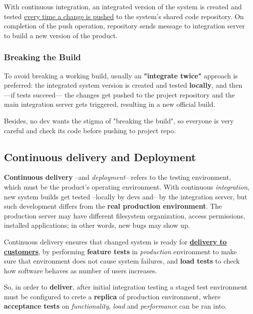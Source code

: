 With continuous integration, an integrated version of the system is created and tested \underline{every time a change is pushed} to the system’s shared code repository.
On completion of the push operation, repository sends message
to integration server to build a new version of the product.

\subsubsection{Breaking the Build}

To avoid breaking a working build, usually an \textbf{"integrate twice"} approach is preferred:
the integrated system version is created and tested \textbf{locally}, and then {---}if tests succeed{---} the changes get pushed to the project repository and the main integration server gets triggered,
resulting in a new official build. 

Besides, no dev wants the stigma of "breaking the build", so everyone is very careful and check its code before pushing to project repo.


\subsection{Continuous delivery and Deployment}
\textbf{Continuous delivery} {--}and \textit{deployment}{--} refers to the testing environment, which must be the product's operating environment.
With continuous \textit{integration}, new system builds get tested {--}locally by devs and{--} by the integration server, but such development differs from the \textbf{real production environment}.
The production server may have different filesystem organization, access
permissions, installed applications;
in other words, new bugs may show up.

Continuous delivery ensures that changed system is ready for \textbf\underline{{delivery}
to customers},
by performing 
\textbf{feature tests} in \textit{production} environment
 to make sure that environment does not cause system failures, and
\textbf{load tests} to check how software behaves as number of users increases.

So, in order to \textbf{deliver}, after initial integration testing a staged test environment must be configured to crete a \textbf{replica} of production environment,
where \textbf{acceptance tests} on \textit{functionality}, \textit{load} and \textit{performance} can be ran into.

